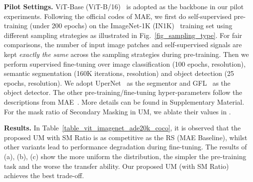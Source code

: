 \documentclass{article}
\begin{document}
\textbf{Pilot Settings.} ViT-Base (ViT-B/16)~\cite{dosovitskiy2020image} is adopted as the backbone in our pilot experiments. Following the official codes of MAE, we first do self-supervised pre-training (under 200 epochs) on the ImageNet-1K (IN1K)~\cite{deng2009imagenet} training set using different sampling strategies as illustrated in Fig.~\ref{fig_sampling_type}. For fair comparisons, the number of input image patches and self-supervised signals are kept \emph{exactly the same} across the sampling strategies during pre-training. Then we perform supervised fine-tuning over image classification (100 epochs,  resolution), semantic segmentation (160K iterations,  resolution) and object detection (25 epochs,  resolution). We adopt UperNet~\cite{xiao2018unified} as the segmentor and GFL~\cite{li2020generalized} as the object detector.
The other pre-training/fine-tuning hyper-parameters follow the descriptions from MAE~\cite{he2021masked}. More details can be found in Supplementary Material. For the mask ratio of Secondary Masking in UM, we ablate their values in .

\textbf{Results.} In Table~\ref{table_vit_imagenet_ade20k_coco}, it is observed that the proposed UM with  SM Ratio is as competitive as the RS (MAE Baseline), whilst other variants lead to performance degradation during fine-tuning. The results of (a), (b), (c) show the more uniform the distribution, the simpler the pre-training task and the worse the transfer ability. Our proposed UM (with  SM Ratio) achieves the best trade-off.
\end{document}
